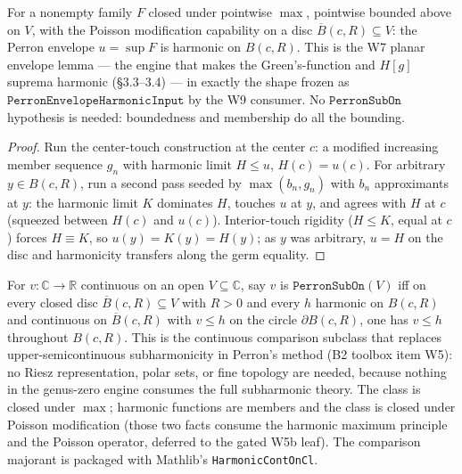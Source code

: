 \begin{lemma}
\label{lem:perron-envelope-harmonic}
For a nonempty family \(F\) closed under pointwise \(\max\), pointwise
bounded above on \(V\), with the Poisson modification capability on a
disc \(\overline{B}(c, R) \subseteq V\): the Perron envelope
\(u = \sup F\) is harmonic on \(B(c, R)\).  This is the W7 planar
envelope lemma — the engine that makes the Green's-function and
\(H[g]\) suprema harmonic (§3.3–3.4) — in exactly the shape frozen as
\(\texttt{PerronEnvelopeHarmonicInput}\) by the W9 consumer.  No
\(\texttt{PerronSubOn}\) hypothesis is needed: boundedness and
membership do all the bounding.
\leanok
\end{lemma}
\begin{proof}\leanok
Run the center-touch construction at the center \(c\): a modified
increasing member sequence \(g_n\) with harmonic limit \(H \le u\),
\(H(c) = u(c)\).  For arbitrary \(y \in B(c,R)\), run a second pass
seeded by \(\max(b_n, g_n)\) with \(b_n\) approximants at \(y\): the
harmonic limit \(K\) dominates \(H\), touches \(u\) at \(y\), and
agrees with \(H\) at \(c\) (squeezed between \(H(c)\) and \(u(c)\)).
Interior-touch rigidity (\(H \le K\), equal at \(c\)) forces
\(H \equiv K\), so \(u(y) = K(y) = H(y)\); as \(y\) was arbitrary,
\(u = H\) on the disc and harmonicity transfers along the germ
equality.
\end{proof}

\begin{definition}
\label{def:perron-sub-on}
For \(v : \mathbb{C} \to \mathbb{R}\) continuous on an open
\(V \subseteq \mathbb{C}\), say \(v\) is \(\texttt{PerronSubOn}(V)\) iff on every
closed disc \(\overline{B}(c, R) \subseteq V\) with \(R > 0\) and every
\(h\) harmonic on \(B(c, R)\) and continuous on \(\overline{B}(c, R)\)
with \(v \le h\) on the circle \(\partial B(c, R)\), one has \(v \le h\)
throughout \(B(c, R)\).  This is the continuous comparison subclass that
replaces upper-semicontinuous subharmonicity in Perron's method (B2
toolbox item W5): no Riesz representation, polar sets, or fine topology
are needed, because nothing in the genus-zero engine consumes the full
subharmonic theory.  The class is closed under \(\max\); harmonic
functions are members and the class is closed under Poisson modification
(those two facts consume the harmonic maximum principle and the Poisson
operator, deferred to the gated W5b leaf).  The comparison majorant is
packaged with Mathlib's \texttt{HarmonicContOnCl}.
\leanok
\end{definition}

